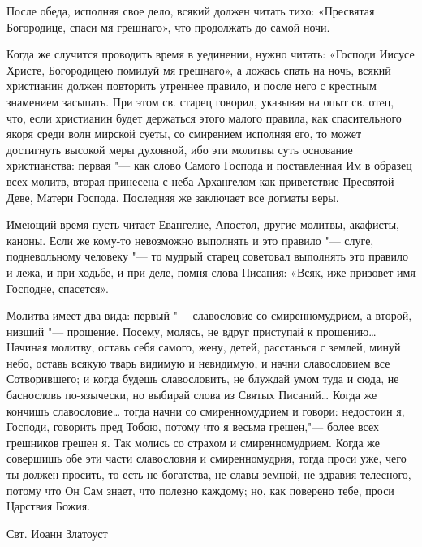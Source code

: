После обеда, исполняя свое дело, всякий должен читать тихо: «Пресвятая Богородице, спаси мя грешнаго», что продолжать до самой ночи. 

Когда же случится проводить время в уединении, нужно читать: «Господи Иисусе Христе, Богородицею помилуй мя грешнаго», а ложась спать на ночь, всякий христианин должен повторить утреннее правило, и после него с крестным знамением засыпать. При этом св. старец говорил, указывая на опыт св. отeц, что, если христианин будет держаться этого малого правила, как спасительного якоря среди волн мирской суеты, со смирением исполняя его, то может достигнуть высокой меры духовной, ибо эти молитвы суть  основание христианства: первая "--- как слово Самого Господа и поставленная Им в образец всех молитв, вторая принесена с неба Архангелом как приветствие Пресвятой Деве, Матери Господа. Последняя же заключает все догматы веры. 

Имеющий время пусть читает Евангелие, Апостол, другие молитвы, акафисты, каноны. Если же кому-то невозможно выполнять и это правило "--- слуге, подневольному человеку "--- то мудрый старец советовал выполнять это правило и лежа, и при ходьбе, и при деле, помня слова Писания: «Всяк, иже призовет имя Господне, спасется». 




\mychapterending

 





Молитва имеет два вида: первый "--- славословие со смиренномудрием, а второй, низший "--- прошение. Посему, молясь, не вдруг приступай к прошению… Начиная молитву, оставь себя самого, жену, детей, расстанься с землей, минуй небо, оставь всякую тварь видимую и невидимую, и начни славословием все Сотворившего; и когда будешь славословить, не блуждай умом туда и сюда, не баснословь по-язычески, но выбирай слова из Святых Писаний… Когда же кончишь славословие… тогда начни со смиренномудрием и говори: недостоин я, Господи, говорить пред Тобою, потому что я весьма грешен,"--- более всех грешников грешен я. Так молись со страхом и смиренномудрием. Когда же совершишь обе эти части славословия и смиренномудрия, тогда проси уже, чего ты должен просить, то есть не богатства, не славы земной, не здравия телесного, потому что Он Сам знает, что полезно каждому; но, как поверено тебе, проси Царствия Божия.

\bigskip
Свт. Иоанн Златоуст

